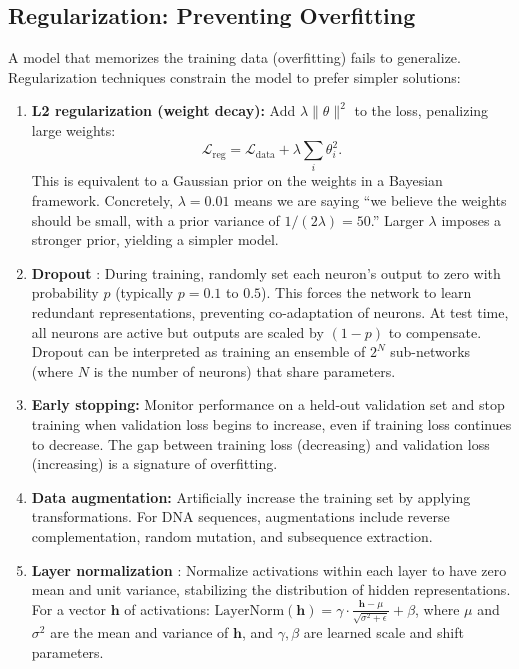 \subsection{Regularization: Preventing Overfitting}

A model that memorizes the training data (overfitting) fails to generalize. Regularization techniques constrain the model to prefer simpler solutions:

\begin{enumerate}[leftmargin=1.5em]
  \item \textbf{L2 regularization (weight decay):} Add $\lambda \|\theta\|^2$ to the loss, penalizing large weights:
  \begin{equation}
  \mathcal{L}_{\text{reg}} = \mathcal{L}_{\text{data}} + \lambda \sum_i \theta_i^2.
  \end{equation}
  This is equivalent to a Gaussian prior on the weights in a Bayesian framework. Concretely, $\lambda = 0.01$ means we are saying ``we believe the weights should be small, with a prior variance of $1/(2\lambda) = 50$.'' Larger $\lambda$ imposes a stronger prior, yielding a simpler model.

  \item \textbf{Dropout} \citep{srivastava2014}: During training, randomly set each neuron's output to zero with probability $p$ (typically $p = 0.1$ to $0.5$). This forces the network to learn redundant representations, preventing co-adaptation of neurons. At test time, all neurons are active but outputs are scaled by $(1-p)$ to compensate. Dropout can be interpreted as training an ensemble of $2^N$ sub-networks (where $N$ is the number of neurons) that share parameters.

  \item \textbf{Early stopping:} Monitor performance on a held-out validation set and stop training when validation loss begins to increase, even if training loss continues to decrease. The gap between training loss (decreasing) and validation loss (increasing) is a signature of overfitting.

  \item \textbf{Data augmentation:} Artificially increase the training set by applying transformations. For DNA sequences, augmentations include reverse complementation, random mutation, and subsequence extraction.

  \item \textbf{Layer normalization} \citep{ba2016}: Normalize activations within each layer to have zero mean and unit variance, stabilizing the distribution of hidden representations. For a vector $\mathbf{h}$ of activations: $\text{LayerNorm}(\mathbf{h}) = \gamma \cdot \frac{\mathbf{h} - \mu}{\sqrt{\sigma^2 + \epsilon}} + \beta$, where $\mu$ and $\sigma^2$ are the mean and variance of $\mathbf{h}$, and $\gamma, \beta$ are learned scale and shift parameters.
\end{enumerate}

